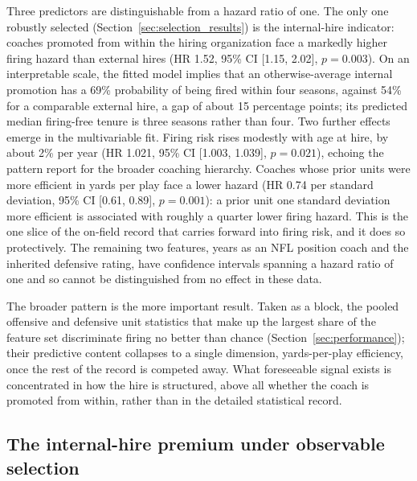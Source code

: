 \documentclass[12pt,USenglish]{article}
\begin{document}
Three predictors are distinguishable from a hazard ratio of one. The only one robustly selected (Section~\ref{sec:selection_results}) is the internal-hire indicator: coaches promoted from within the hiring organization face a markedly higher firing hazard than external hires (HR 1.52, 95\% CI [1.15, 2.02], $p = 0.003$). On an interpretable scale, the fitted model implies that an otherwise-average internal promotion has a 69\% probability of being fired within four seasons, against 54\% for a comparable external hire, a gap of about 15 percentage points; its predicted median firing-free tenure is three seasons rather than four. Two further effects emerge in the multivariable fit. Firing risk rises modestly with age at hire, by about 2\% per year (HR 1.021, 95\% CI [1.003, 1.039], $p = 0.021$), echoing the pattern \citet{farnell2021} report for the broader coaching hierarchy. Coaches whose prior units were more efficient in yards per play face a lower hazard (HR 0.74 per standard deviation, 95\% CI [0.61, 0.89], $p = 0.001$): a prior unit one standard deviation more efficient is associated with roughly a quarter lower firing hazard. This is the one slice of the on-field record that carries forward into firing risk, and it does so protectively. The remaining two features, years as an NFL position coach and the inherited defensive rating, have confidence intervals spanning a hazard ratio of one and so cannot be distinguished from no effect in these data.

The broader pattern is the more important result. Taken as a block, the pooled offensive and defensive unit statistics that make up the largest share of the feature set discriminate firing no better than chance (Section~\ref{sec:performance}); their predictive content collapses to a single dimension, yards-per-play efficiency, once the rest of the record is competed away. What foreseeable signal exists is concentrated in how the hire is structured, above all whether the coach is promoted from within, rather than in the detailed statistical record.

\subsection{The internal-hire premium under observable selection}
\label{sec:probe_results}
\end{document}
